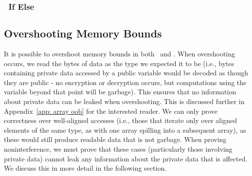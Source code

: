 % 
% 



%
%






%
%





%
%

\subsubsection{\piccoC\ If Else} \label{subsec: \piccoC if else}



\subsection{Overshooting Memory Bounds} \label{Sec: Overshooting}
%
It is possible to overshoot memory bounds in both \vanillaC\ and \piccoC. 
When overshooting occurs, we read the bytes of data as the type we expected it to be (i.e., bytes containing private data accessed by a public variable would be decoded as though they are public - no encryption or decryption occurs, but computations using the variable beyond that point will be garbage). 
This ensures that no information about private data can be leaked when overshooting. 
This is discussed further in Appendix~\ref{app: array oob} for the interested reader. 
We can only prove correctness over well-aligned accesses (i.e., those that iterate only over aligned elements of the same type, as with one array spilling into a subsequent array), as these would still produce readable data that is not garbage. 
When proving noninterference, we must prove that these cases (particularly those involving private data) cannot leak any information about the private data that is affected. We discuss this in more detail in the following section.








